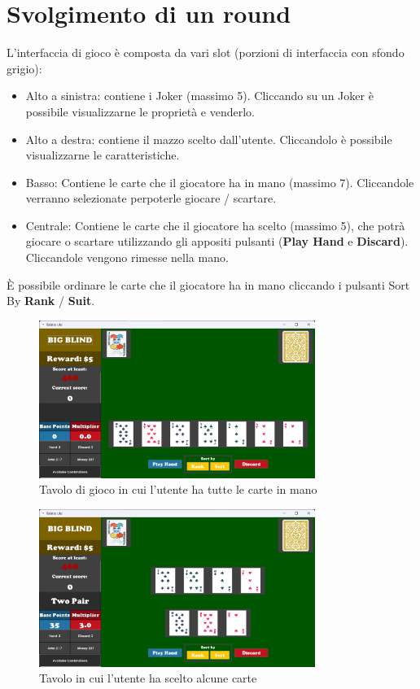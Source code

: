 \documentclass[a4paper,12pt]{report}
\begin{document}
\section{Svolgimento di un round}

L'interfaccia di gioco è composta da vari slot (porzioni di interfaccia con sfondo grigio):
\begin{itemize}
    \item Alto a sinistra: contiene i Joker (massimo 5). Cliccando su un Joker è possibile visualizzarne le proprietà e venderlo.
    \item Alto a destra: contiene il mazzo scelto dall'utente. Cliccandolo è possibile visualizzarne le caratteristiche.
    \item Basso: Contiene le carte che il giocatore ha in mano (massimo 7). Cliccandole verranno selezionate perpoterle giocare / scartare.
    \item Centrale: Contiene le carte che il giocatore ha scelto (massimo 5), che potrà giocare o scartare utilizzando gli appositi pulsanti (\textbf{Play Hand} e \textbf{Discard}). Cliccandole vengono rimesse nella mano.
\end{itemize}
È possibile ordinare le carte che il giocatore ha in mano cliccando i pulsanti Sort By \textbf{Rank} / \textbf{Suit}.

\begin{figure}[H]
	\centering{}
	\includegraphics[width=0.8\textwidth]{img/guida/04-GameTable}
	\caption{Tavolo di gioco in cui l'utente ha tutte le carte in mano}
	\label{img:guida:tavolo}
\end{figure}

\begin{figure}[H]
	\centering{}
	\includegraphics[width=0.8\textwidth]{img/guida/06-CardStaged}
	\caption{Tavolo in cui l'utente ha scelto alcune carte}
	\label{img:guida:cartescelte}
\end{figure}
\end{document}
